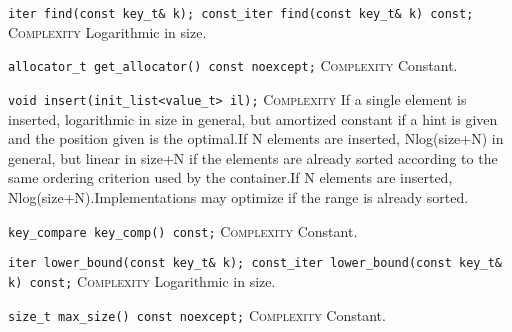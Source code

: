 \noindent{}\hspace*{0.25em}\lstinline[basicstyle=\ttfamily\color{clime}]{iter find(const key_t& k); const_iter find(const key_t& k) const;} \textsc{Complexity} Logarithmic in size.\\\vspace{-0.6em}

\noindent{}\hspace*{0.25em}\lstinline[basicstyle=\ttfamily\color{cgreen}]{allocator_t get_allocator() const noexcept;} \textsc{Complexity} Constant.\\\vspace{-0.6em}

\noindent{}\hspace*{0.25em}\lstinline[basicstyle=\ttfamily\color{corange}]{void insert(init_list<value_t> il);} \textsc{Complexity} If a single element is inserted, logarithmic in size in general, but amortized constant if a hint is given and the position given is the optimal.If N elements are inserted, Nlog(size+N) in general, but linear in size+N if the elements are already sorted according to the same ordering criterion used by the container.If N elements are inserted, Nlog(size+N).Implementations may optimize if the range is already sorted.\\\vspace{-0.6em}

\noindent{}\hspace*{0.25em}\lstinline[basicstyle=\ttfamily\color{cgreen}]{key_compare key_comp() const;} \textsc{Complexity} Constant.\\\vspace{-0.6em}

\noindent{}\hspace*{0.25em}\lstinline[basicstyle=\ttfamily\color{clime}]{iter lower_bound(const key_t& k); const_iter lower_bound(const key_t& k) const;} \textsc{Complexity} Logarithmic in size.\\\vspace{-0.6em}

\noindent{}\hspace*{0.25em}\lstinline[basicstyle=\ttfamily\color{cgreen}]{size_t max_size() const noexcept;} \textsc{Complexity} Constant.\\\vspace{-0.6em}

